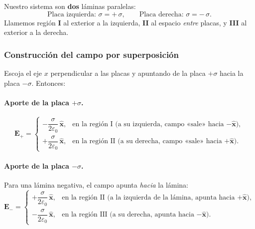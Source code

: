\documentclass{article}
\begin{document}
Nuestro sistema son \textbf{dos} láminas paralelas:
\[
\text{Placa izquierda: } \sigma=+\,\sigma,\qquad
\text{Placa derecha: } \sigma=-\,\sigma.
\]
Llamemos región \textbf{I} al exterior a la izquierda, \textbf{II} al espacio \emph{entre} placas, y \textbf{III} al exterior a la derecha.

\subsubsection*{Construcción del campo por superposición}
Escoja el eje $x$ perpendicular a las placas y apuntando de la placa $+\sigma$ hacia la placa $-\sigma$. Entonces:

\paragraph{Aporte de la placa $+\sigma$.}
\[
\mathbf E_{+}=
\begin{cases}
-\dfrac{\sigma}{2\varepsilon_0}\,\hat{\mathbf x}, & \text{en la región I (a su izquierda, campo «sale» hacia $-\hat{\mathbf x}$)},\\[6pt]
+\dfrac{\sigma}{2\varepsilon_0}\,\hat{\mathbf x}, & \text{en la región II (a su derecha, campo «sale» hacia $+\hat{\mathbf x}$)}.
\end{cases}
\]

\paragraph{Aporte de la placa $-\sigma$.}
Para una lámina negativa, el campo apunta \emph{hacia} la lámina:
\[
\mathbf E_{-}=
\begin{cases}
+\dfrac{\sigma}{2\varepsilon_0}\,\hat{\mathbf x}, & \text{en la región II (a la izquierda de la lámina, apunta hacia $+\hat{\mathbf x}$)},\\[6pt]
-\dfrac{\sigma}{2\varepsilon_0}\,\hat{\mathbf x}, & \text{en la región III (a su derecha, apunta hacia $-\hat{\mathbf x}$)}.
\end{cases}
\]
\end{document}
